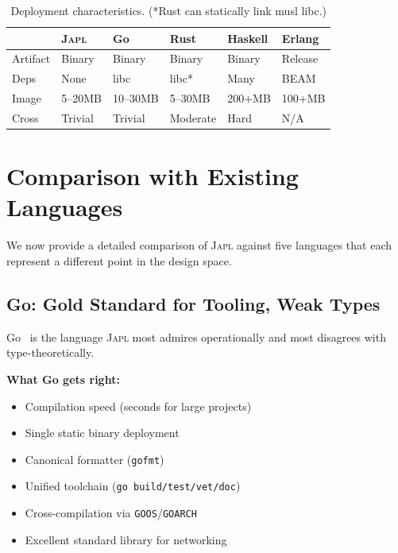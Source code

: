 \documentclass[11pt,twocolumn]{article}
\newcommand{\japl}{\textsc{Japl}}
\begin{document}
\begin{table}[H]
\centering
\scriptsize
\begin{tabularx}{\columnwidth}{lXXXXX}
\toprule
& \textbf{\japl{}} & \textbf{Go} & \textbf{Rust} & \textbf{Haskell} & \textbf{Erlang} \\
\midrule
Artifact & Binary & Binary & Binary & Binary & Release \\
Deps & None & libc & libc* & Many & BEAM \\
Image & 5--20MB & 10--30MB & 5--30MB & 200+MB & 100+MB \\
Cross & Trivial & Trivial & Moderate & Hard & N/A \\
\bottomrule
\end{tabularx}
\caption{Deployment characteristics. (*Rust can statically link musl libc.)}
\label{tab:deployment}
\end{table}

\section{Comparison with Existing Languages}
\label{sec:comparison}

We now provide a detailed comparison of \japl{} against five languages that each represent a different point in the design space.

\subsection{Go: Gold Standard for Tooling, Weak Types}

Go~\citep{pike2012go,donovan2015go} is the language \japl{} most admires operationally and most disagrees with type-theoretically.

\textbf{What Go gets right:}
\begin{itemize}[leftmargin=*]
\item Compilation speed (seconds for large projects)
\item Single static binary deployment
\item Canonical formatter (\texttt{gofmt})
\item Unified toolchain (\texttt{go build/test/vet/doc})
\item Cross-compilation via \texttt{GOOS}/\texttt{GOARCH}
\item Excellent standard library for networking
\end{itemize}
\end{document}
